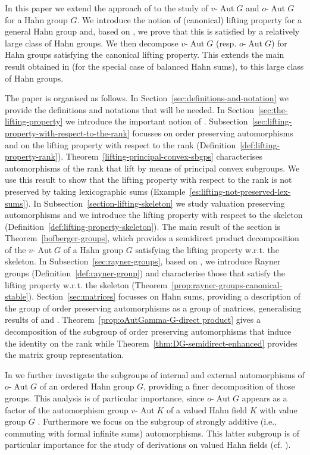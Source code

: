 \documentclass[12pt,a4paper,reqno,openright]{amsart}
\renewcommand{\1}{\mathbbm{1}}
\DeclareMathOperator{\Aut}{Aut}
\newcommand{\vAut}{v\text{-}\Aut}
\newcommand{\oAut}{o\text{-}\Aut}
\theoremstyle{definition}
\theoremstyle{plain}
\theoremstyle{plain}
\theoremstyle{plain}
\theoremstyle{plain}
\theoremstyle{plain}
\theoremstyle{plain}
\theoremstyle{plain}
\theoremstyle{plain}
\theoremstyle{definition}
\theoremstyle{definition}
\theoremstyle{plain}
\theoremstyle{definition}
\theoremstyle{definition}
\theoremstyle{plain}
\theoremstyle{plain}
\theoremstyle{plain}
\begin{document}
In this paper we extend the approach of \cite{ours-fields} to the study of $ \vAut G $ and $ \oAut G $ for a Hahn group $ G $.
We introduce the notion of (canonical) lifting property for a general Hahn group and, based on \cite{KKS-rayner-structures}, we prove that this is satisfied by a relatively large class of Hahn groups. We then decompose $ \vAut G $ (resp. $ \oAut G $) for Hahn groups satisfying the canonical lifting property. This extends the main result obtained in \cite{droste-goebel} (for the special case of balanced Hahn sums), to this large class of Hahn groups.

The paper is organised as follows.
In Section~\ref{sec:definitions-and-notation} we provide the definitions and notations that will be needed. In Section~\ref{sec:the-lifting-property} we introduce the important notion of . Subsection~\ref{sec:lifting-property-with-respect-to-the-rank} focusses on order preserving automorphisms and on the lifting property with respect to the rank (Definition~\ref{def:lifting-property-rank}). Theorem~\ref{lifting-principal-convex-sbgps} characterises automorphisms of the rank that lift by means of principal convex subgroups. We use this result to show that the lifting property with respect to the rank is not preserved by taking lexicographic sums (Example~\ref{es:lifting-not-preserved-lex-sums}).
In Subsection~\ref{section-lifting-skeleton} we study valuation preserving automorphisms and we introduce the lifting property with respect to the skeleton (Definition~\ref{def:lifting-property-skeleton}). The main result of the section is Theorem~\ref{hofberger-groups}, which provides a semidirect product decomposition of the $ \vAut G $ of a Hahn group $ G $ satisfying the lifting property w.r.t. the skeleton. In Subsection~\ref{sec:rayner-groups}, based on \cite{KKS-rayner-structures}, we introduce Rayner groups (Definition~\ref{def:rayner-group}) and characterise those that satisfy the lifting property w.r.t. the skeleton (Theorem~\ref{prop:rayner-groups-canonical-stable}).
Section~\ref{sec:matrices} focusses on Hahn sums, providing a description of the group of order preserving automorphisms as a group of matrices, generalising results of \cite{conrad} and \cite{droste-goebel}. Theorem~\ref{prop:oAutGamma-G-direct product} gives a decomposition of the subgroup of order preserving automorphisms that induce the identity on the rank while Theorem~\ref{thm:DG-semidirect-enhanced} provides the matrix group representation.


In \cite{kaplansky-lifting} we further investigate the subgroups of internal and external automorphisms of $ \oAut G $ of an ordered Hahn group $ G $, providing a finer decomposition of those groups. This analysis is of particular importance, since $ \oAut G $ appears as a factor of the automorphism group $ \vAut K $ of a valued Hahn field $ K $ with value group $G$ \cite{ours-fields}. Furthermore we focus on the subgroup of strongly additive (i.e., commuting with formal infinite sums) automorphisms. This latter subgroup is of particular importance for the study of derivations on valued Hahn fields (cf. \cite{derivations}).
\end{document}
